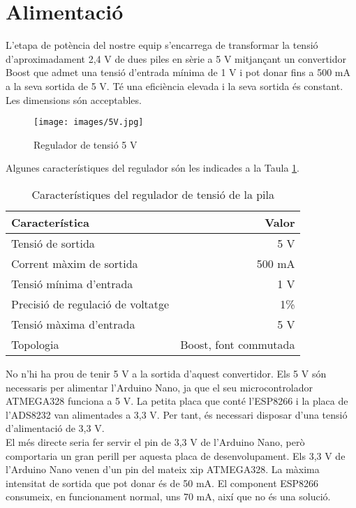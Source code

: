 \section{Alimentació}
L'etapa de potència del nostre equip s'encarrega de transformar la tensió d'aproximadament 2,4 V de dues piles en sèrie a 5 V mitjançant un convertidor Boost que admet una tensió d'entrada mínima de 1 V i pot donar fins a 500 mA a la seva sortida de 5 V. Té una eficiència elevada i la seva sortida és constant. Les dimensions són acceptables.
\begin{figure}[H]
\begin{center}
\texttt{[image: images/5V.jpg]}
\end{center}
\caption{Regulador de tensió 5 V}
\label{fig: 5v}
\end{figure}
\noindent Algunes característiques del regulador són les indicades a la Taula \ref{tab:regulador}.
\begin{table}[H]
\small
\begin{center}
 \begin{tabular} {|l|r|}%
 \hline
 Característica & Valor \\
 \hline \hline 
Tensió de sortida & 5 V \\ \hline
Corrent màxim de sortida & 500 mA\\ \hline
Tensió mínima d'entrada & 1 V \\ \hline
Precisió de regulació de voltatge & 1\% \\ \hline
Tensió màxima d'entrada & 5 V \\ \hline
Topologia & Boost, font commutada \\ \hline
 \end{tabular}
 \caption{Característiques del regulador de tensió de la pila}
 \label{tab:regulador}
\end{center}
\end{table}
\noindent No n'hi ha prou de tenir 5 V a la sortida d'aquest convertidor. Els 5 V són necessaris per alimentar l'Arduino Nano, ja que el seu microcontrolador ATMEGA328 funciona a 5 V. La petita placa que conté l'ESP8266 i la placa de l'ADS8232 van alimentades a 3,3 V. Per tant, és necessari disposar d'una tensió d'alimentació de 3,3 V.\\
\newline El més directe seria fer servir el pin de 3,3 V de l'Arduino Nano, però comportaria un gran perill per aquesta placa de desenvolupament. Els 3,3 V de l'Arduino Nano venen d'un pin del mateix xip ATMEGA328. La màxima intensitat de sortida que pot donar és de 50 mA. El component ESP8266 consumeix, en funcionament normal, uns 70 mA, així que no és una solució.\\

